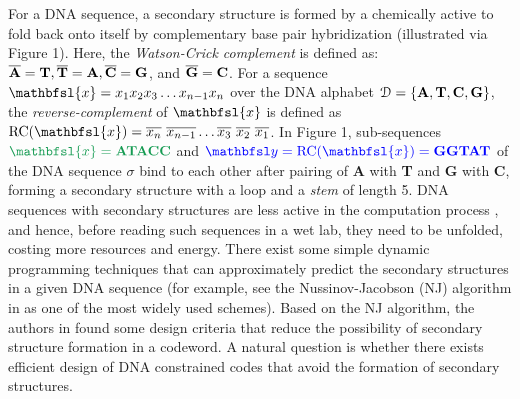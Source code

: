\documentclass[conference]{IEEEtran}
\theoremstyle{plain}
\theoremstyle{definition}
\newcommand{\D}{{\mathcal D}}
\newcommand{\by}{{\mathbfsl y}}
\newcommand{\bx}{{\mathbfsl{x}}}
\begin{document}

For a DNA sequence, a secondary structure is formed by a chemically active to fold back onto itself by complementary base pair hybridization (illustrated via Figure 1). Here, the {\em Watson-Crick complement} is defined as: $\overline{{\bf A}}={\bf T}, \overline{\bf T}={\bf A}, \overline{\bf C}={\bf G}$, and $\overline{\bf G}={\bf C}$. For a sequence $\bx=x_1x_2x_3\ldots x_{n-1}x_n$ over the DNA alphabet $\D=\{{\bf A}, {\bf T}, {\bf C}, {\bf G}\}$, the {\em reverse-complement} of $\bx$ is defined as ${\rm RC}({\bx})={\overline{x_n}} \text{ } \overline{x_{n-1}}\ldots  \overline{x_3}  \text{ } \overline{x_2}  \text{ } \overline{x_1}$. In Figure 1, sub-sequences ${\color{ForestGreen}{\bx={\bf A}{\bf T}{\bf A}{\bf C}{\bf C}}}$ and ${\color{blue}{\by={\rm RC}({\bx})={\bf G}{\bf G}{\bf T}{\bf A}{\bf T}}}$ of the DNA sequence $\sigma$ bind to each other after pairing of {\bf A} with {\bf T} and {\bf G} with {\bf C}, forming a secondary structure with a loop and a {\em stem} of length 5. DNA sequences with secondary structures are less active in the computation process \cite{O2:2005}, and hence, before reading such sequences in a wet lab, they need to be unfolded, costing more resources and energy. There exist some simple dynamic programming techniques \cite{Bres:1986,RN:1980} that can approximately predict the secondary structures in a given DNA sequence (for example, see the Nussinov-Jacobson (NJ) algorithm in \cite{RN:1980} as one of the most widely used schemes). Based on the NJ algorithm, the authors in \cite{O2:2005, O:2005} found some design criteria that reduce the possibility of secondary structure formation in a codeword. A natural question is whether there exists efficient design of DNA constrained codes that avoid the formation of secondary structures. 
\end{document}
